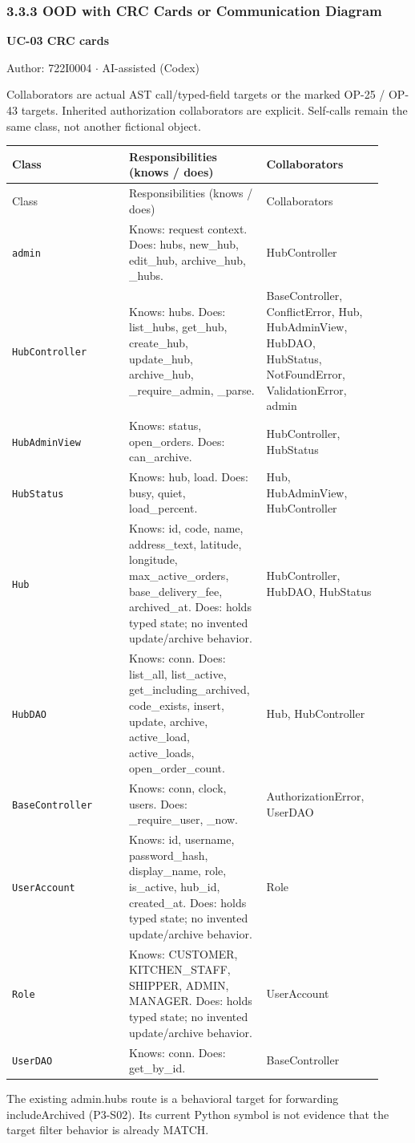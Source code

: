 \subsubsection*{3.3.3 OOD with CRC Cards or Communication Diagram}
\label{CRC-UC-03}
\textbf{UC-03 CRC cards}

Author: 722I0004 \ensuremath{\cdot} AI-assisted (Codex)

Collaborators are actual AST call/typed-field targets or the marked OP-25 / OP-43 targets. Inherited authorization collaborators are explicit. Self-calls remain the same class, not another fictional object.

\begin{longtable}{>{\raggedright\arraybackslash}p{0.3067\linewidth}>{\raggedright\arraybackslash}p{0.3067\linewidth}>{\raggedright\arraybackslash}p{0.3067\linewidth}}
Class & Responsibilities (knows / does) & Collaborators \\
\hline\endfirsthead
Class & Responsibilities (knows / does) & Collaborators \\
\hline\endhead
\texttt{admin} & Knows: request context. Does: hubs, new\_hub, edit\_hub, archive\_hub, \_hubs. & HubController \\
\texttt{HubController} & Knows: hubs. Does: list\_hubs, get\_hub, create\_hub, update\_hub, archive\_hub, \_require\_admin, \_parse. & BaseController, ConflictError, Hub, HubAdminView, HubDAO, HubStatus, NotFoundError, ValidationError, admin \\
\texttt{HubAdminView} & Knows: status, open\_orders. Does: can\_archive. & HubController, HubStatus \\
\texttt{HubStatus} & Knows: hub, load. Does: busy, quiet, load\_percent. & Hub, HubAdminView, HubController \\
\texttt{Hub} & Knows: id, code, name, address\_text, latitude, longitude, max\_active\_orders, base\_delivery\_fee, archived\_at. Does: holds typed state; no invented update/archive behavior. & HubController, HubDAO, HubStatus \\
\texttt{HubDAO} & Knows: conn. Does: list\_all, list\_active, get\_including\_archived, code\_exists, insert, update, archive, active\_load, active\_loads, open\_order\_count. & Hub, HubController \\
\texttt{BaseController} & Knows: conn, clock, users. Does: \_require\_user, \_now. & AuthorizationError, UserDAO \\
\texttt{UserAccount} & Knows: id, username, password\_hash, display\_name, role, is\_active, hub\_id, created\_at. Does: holds typed state; no invented update/archive behavior. & Role \\
\texttt{Role} & Knows: CUSTOMER, KITCHEN\_STAFF, SHIPPER, ADMIN, MANAGER. Does: holds typed state; no invented update/archive behavior. & UserAccount \\
\texttt{UserDAO} & Knows: conn. Does: get\_by\_id. & BaseController \\
\end{longtable}
The existing admin.hubs route is a behavioral target  for forwarding includeArchived (P3-S02). Its current Python symbol is not evidence that the target filter behavior is already MATCH.
